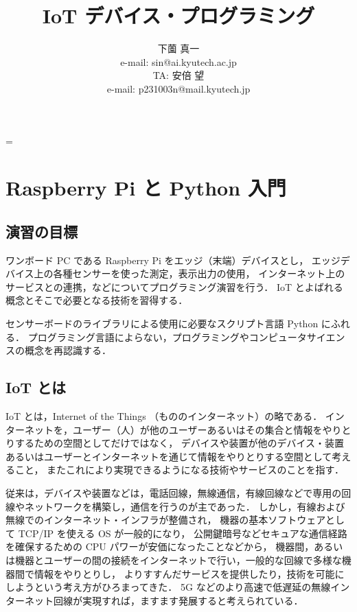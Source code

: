 \documentclass[11pt,a4,epsf]{report}
\title{{\bf IoT デバイス・プログラミング}}
\author{下薗 真一\\
e-mail: {\sf sin@ai.kyutech.ac.jp}\\[1ex]
 TA: 安倍 望 \\
 e-mail: {\sf p231003n@mail.kyutech.jp}
}
\date{}
\def\linesparpage#1{\baselineskip=\textheight\divide\baselineskip#1}
\begin{document}
\linesparpage{38}
\maketitle



\medskip

\chapter{Raspberry Pi と Python 入門}

\section{演習の目標}

ワンボード PC である Raspberry Pi をエッジ（末端）デバイスとし，
エッジデバイス上の各種センサーを使った測定，表示出力の使用，
インターネット上のサービスとの連携，などについてプログラミング演習を行う．
IoT とよばれる概念とそこで必要となる技術を習得する．

センサーボードのライブラリによる使用に必要なスクリプト言語 Python にふれる．
プログラミング言語によらない，プログラミングやコンピュータサイエンスの概念を再認識する．

\section{IoT とは}

IoT とは，Internet of the Things （もののインターネット）の略である．
インターネットを，ユーザー（人）が他のユーザーあるいはその集合と情報をやりとりするための空間としてだけではなく，
デバイスや装置が他のデバイス・装置あるいはユーザーとインターネットを通じて情報をやりとりする空間として考えること，
またこれにより実現できるようになる技術やサービスのことを指す．

従来は，デバイスや装置などは，電話回線，無線通信，有線回線などで専用の回線やネットワークを構築し，通信を行うのが主であった．
しかし，有線および無線でのインターネット・インフラが整備され，
機器の基本ソフトウェアとして TCP/IP を使える OS が一般的になり，
公開鍵暗号などセキュアな通信経路を確保するための CPU パワーが安価になったことなどから，
機器間，あるいは機器とユーザーの間の接続をインターネットで行い，一般的な回線で多様な機器間で情報をやりとりし，
よりすすんだサービスを提供したり，技術を可能にしようという考え方がひろまってきた．
5G などのより高速で低遅延の無線インターネット回線が実現すれば，ますます発展すると考えられている．
\end{document}
